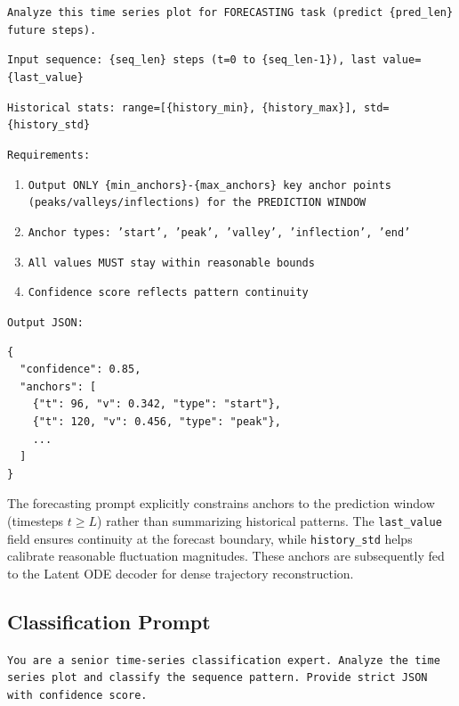 \begin{tcolorbox}[colback=blue!5, colframe=blue!30, title=User Prompt Template (Forecasting)]
\small
\texttt{Analyze this time series plot for FORECASTING task (predict \{pred\_len\} future steps).}

\texttt{Input sequence: \{seq\_len\} steps (t=0 to \{seq\_len-1\}), last value=\{last\_value\}}

\texttt{Historical stats: range=[\{history\_min\}, \{history\_max\}], std=\{history\_std\}}

\texttt{Requirements:}
\begin{enumerate}[leftmargin=*, itemsep=0pt]
    \item \texttt{Output ONLY \{min\_anchors\}-\{max\_anchors\} key anchor points (peaks/valleys/inflections) for the PREDICTION WINDOW}
    \item \texttt{Anchor types: 'start', 'peak', 'valley', 'inflection', 'end'}
    \item \texttt{All values MUST stay within reasonable bounds}
    \item \texttt{Confidence score reflects pattern continuity}
\end{enumerate}

\texttt{Output JSON:}
\begin{verbatim}
{
  "confidence": 0.85,
  "anchors": [
    {"t": 96, "v": 0.342, "type": "start"},
    {"t": 120, "v": 0.456, "type": "peak"},
    ...
  ]
}
\end{verbatim}
\end{tcolorbox}

The forecasting prompt explicitly constrains anchors to the prediction window (timesteps $t \geq L$) rather than summarizing historical patterns. The \texttt{last\_value} field ensures continuity at the forecast boundary, while \texttt{history\_std} helps calibrate reasonable fluctuation magnitudes. These anchors are subsequently fed to the Latent ODE decoder for dense trajectory reconstruction.

\subsection{Classification Prompt}
\label{appx:prompt_classification}

\begin{tcolorbox}[colback=gray!5, colframe=gray!50, title=System Prompt (Classification)]
\small
\texttt{You are a senior time-series classification expert. Analyze the time series plot and classify the sequence pattern. Provide strict JSON with confidence score.}
\end{tcolorbox}

